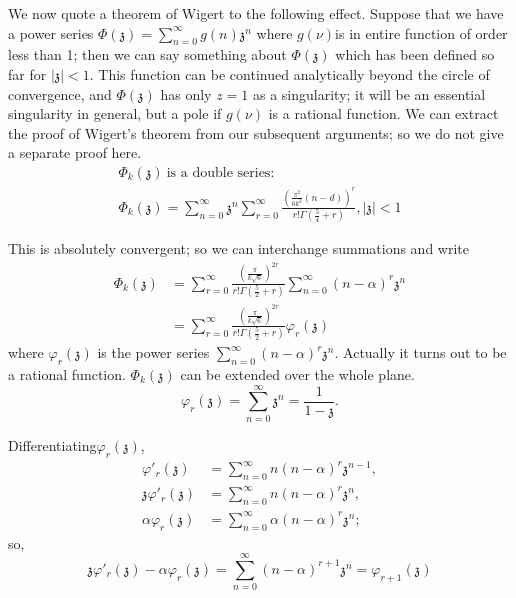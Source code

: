 We now quote a theorem of Wigert to the following effect. Suppose that
we have a power series $\Phi (\mathfrak{z}) = \sum\limits^\infty_{n=0}
g(n) \mathfrak{z}^n$ where $g(\nu)$\pageoriginale is in entire
function of order less than 1; then we can say something about $\Phi
(\mathfrak{z})$ which has been defined so far for $|\mathfrak{z}| <
1$. This function can be continued analytically beyond the circle of
convergence, and $\Phi (\mathfrak{z})$ has only $z=1$ as a
singularity; it will be an essential singularity in general, but a
pole if $g(\nu)$ is a rational function. We can extract the proof of
Wigert's theorem from our subsequent arguments; so we do not give a
separate proof here. 
\begin{gather*}
  \Phi_k (\mathfrak{z}) ~\text{is a double series}:\\
  \Phi_k (\mathfrak{z}) = \sum^\infty_{n=0} \mathfrak{z}^n
  \sum^\infty_{r=0} \frac{\left( \frac{\pi^2}{6k^2} (n-d)\right)^r}{r!
    \Gamma \left( \frac{5}{4} + r\right)}, |\mathfrak{z}|<1
\end{gather*}

This is absolutely convergent; so we can interchange summations and
write
\begin{align*}
  \Phi_k (\mathfrak{z}) & = \sum^\infty_{r=0} \frac{\left(
    \frac{\pi}{k\sqrt{6}}\right)^{2r}}{r! \Gamma \left( \frac{5}{2}+
    r\right)} \sum^\infty_{n=0} (n- \alpha)^r \mathfrak{z}^n\\
  & = \sum^\infty_{r=0} \frac{\left(
    \frac{\pi}{k\sqrt{6}}\right)^{2r}}{r! \Gamma \left(\frac{5}{2} + r
    \right)} \varphi_r (\mathfrak{z})
\end{align*}
where $\varphi_r (\mathfrak{z})$ is the power series
$\sum\limits^\infty_{n=0} (n- \alpha)^r \mathfrak{z}^n$. Actually it
turns out to be a rational function. $\Phi_k (\mathfrak{z})$ can be
extended over the whole plane.
$$
\varphi_r (\mathfrak{z}) = \sum^\infty_{n=0} \mathfrak{z}^n = 
\frac{1}{1- \mathfrak{z}}. 
$$

Differentiating\pageoriginale $\varphi_r (\mathfrak{z})$,
\begin{align*}
  \varphi'_r (\mathfrak{z}) & = \sum^\infty_{n=0} n (n- \alpha)^r
  \mathfrak{z}^{n-1},\\
  \mathfrak{z} \varphi'_r (\mathfrak{z}) & = \sum^{\infty}_{n=0} n(n-
  \alpha)^r \mathfrak{z}^n,\\
  \alpha \varphi_r (\mathfrak{z}) & = \sum^\infty_{n=0} \alpha (n-
  \alpha)^r \mathfrak{z}^n;
\end{align*}
so, 
$$
\mathfrak{z} \varphi'_r (\mathfrak{z}) - \alpha \varphi_r
(\mathfrak{z}) = \sum^\infty_{n=0} (n- \alpha)^{r+1} \mathfrak{z}^n =
\varphi_{r+1} (\mathfrak{z}) 
$$

